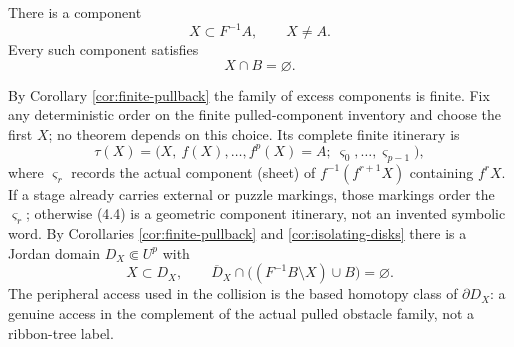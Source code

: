 \begin{proposition}\label{prop:excess}
There is a component
\[
 X\subset F^{-1}A,\qquad X\ne A.                    \tag{4.1}
\]
Every such component satisfies
\[
 X\cap B=\varnothing.                                \tag{4.2}
\]
\end{proposition}

\begin{remark}\label{rem:certificate}
By Corollary \ref{cor:finite-pullback} the family of excess components is finite.  Fix any deterministic order on the finite pulled-component inventory and choose the first \(X\); no theorem depends on this choice.  Its complete finite itinerary is
\[
 \tau(X)=\bigl(X,\ f(X),\dots,f^p(X)=A;\ \varsigma_0,\dots,\varsigma_{p-1}\bigr),  \tag{4.4}
\]
where \(\varsigma_r\) records the actual component (sheet) of \(f^{-1}(f^{r+1}X)\) containing \(f^rX\).  If a stage already carries external or puzzle markings, those markings order the \(\varsigma_r\); otherwise (4.4) is a geometric component itinerary, not an invented symbolic word.  By Corollaries \ref{cor:finite-pullback} and \ref{cor:isolating-disks} there is a Jordan domain \(D_X\Subset U^p\) with
\[
 X\subset D_X,\qquad \overline D_X\cap\bigl((F^{-1}B\setminus X)\cup B\bigr)=\varnothing.  \tag{4.5}
\]
The peripheral access used in the collision is the based homotopy class of \(\partial D_X\): a genuine access in the complement of the actual pulled obstacle family, not a ribbon-tree label.
\end{remark}

